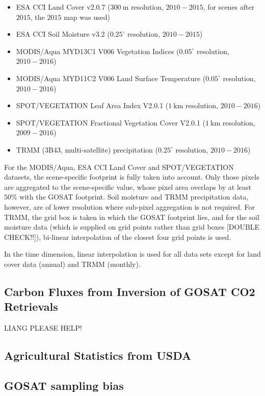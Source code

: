 \documentclass[preprint, a4paper, 10pt, times]{elsarticle}
\begin{document}
\begin{itemize}
\item ESA CCI Land Cover v2.0.7 ($300\:\mathrm{m}$ resolution, $2010-2015$, for scenes after $2015$, the $2015$ map was used) \citep{Bontemps2013}
\item ESA CCI Soil Moisture v3.2 ($0.25^\circ$ resolution, $2010-2015$) \citep{Dorigo2017}
\item MODIS/Aqua MYD13C1 V006 Vegetation Indices ($0.05^\circ$ resolution, $2010-2016$) \citep{MYD13C1}
\item MODIS/Aqua MYD11C2 V006 Land Surface Temperature ($0.05^\circ$ resolution, $2010-2016$) \citep{MYD11C2}
\item SPOT/VEGETATION Leaf Area Index V2.0.1 ($1\:\mathrm{km}$ resolution, $2010-2016$)
\item SPOT/VEGETATION Fractional Vegetation Cover V2.0.1 ($1\:\mathrm{km}$ resolution, $2009-2016$)
\item TRMM (3B43, multi-satellite) precipitation ($0.25^\circ$ resolution, $2010-2016$)
\end{itemize}

For the MODIS/Aqua, ESA CCI Land Cover and SPOT/VEGETATION datasets, the scene-specific footprint is fully taken into account. Only those pixels are aggregated to the scene-specific value, whose pixel area overlaps by at least $50\%$ with the GOSAT footprint. Soil moisture and TRMM precipitation data, however, are of lower resolution where sub-pixel aggregation is not required. For TRMM, the grid box is taken in which the GOSAT footprint lies, and for the soil moisture data (which is supplied on grid points rather than grid boxes [DOUBLE CHECK!!]), bi-linear interpolation of the closest four grid points is used.

In the time dimension, linear interpolation is used for all data sets except for land cover data (annual) and TRMM (monthly).


\subsection{Carbon Fluxes from Inversion of GOSAT CO2 Retrievals}
\label{sec:fluxes}
LIANG PLEASE HELP!

\subsection{Agricultural Statistics from USDA}
\label{sec:usda}

\subsection{GOSAT sampling bias}
\label{sec:sampling_bias}
\end{document}
